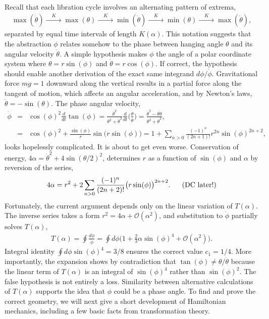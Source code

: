 \documentclass[nofootinbib,preprint]{revtex4-1}
\begin{document}
Recall that each libration cycle involves an alternating pattern of extrema,
\begin{eqnarray}
\max(\dot{\theta}) \xrightarrow{\;\;\;\;K\;\;\;\;} \max(\theta) 
 \xrightarrow{\;\;\;\;K\;\;\;\;} \min(\dot{\theta})
 \xrightarrow{\;\;\;\;K\;\;\;\;} \min(\theta) 
 \xrightarrow{\;\;\;\;K\;\;\;\;} \max(\dot{\theta}) \nonumber,
\end{eqnarray} 
separated by equal time intervals of length $K(\alpha)$. This notation suggests that the 
abstraction $\phi$ relates somehow to the phase between hanging angle $\theta$ and its angular 
velocity $\dot{\theta}$. A simple hypothesis makes $\phi$ the angle of a polar coordinate
system where $\theta=r\sin(\phi)$ and $\dot{\theta}=r\cos(\phi)$. If correct, the hypothesis should 
enable another derivation of the exact same integrand $d\phi/\dot{\phi}$. Gravitational force 
$mg=1$ downward along the vertical results in a partial force along the tangent of motion, 
which affects an angular acceleration, and by Newton's laws, $\ddot{\theta}=-\sin(\theta)$. 
The phase angular velocity,
\begin{eqnarray}
\dot{\phi} &=& \cos(\phi)^2 \frac{d}{dt} \tan(\phi) 
= \frac{\dot{\theta}^2}{\theta^2+\dot{\theta}^2}\frac{d}{dt}\bigg(\frac{\theta}{\dot{\theta}}\bigg)
=\frac{\dot{\theta}^2-\theta\ddot{\theta} }{\theta^2+\dot{\theta}^2}, \nonumber \\
&=& \cos(\phi)^2+\frac{\sin(\phi)}{r}\sin\big(r \sin(\phi)\big) \nonumber 
 = 1+\sum_{n>0} \frac{(-1)^n}{(2n+1)!} r^{2n} \sin(\phi)^{2n+2}, \nonumber
\end{eqnarray}
looks hopelessly complicated. It is about to get even worse. Conservation of 
energy, ${4 \alpha=\dot{\theta}^2+4 \sin(\theta/2)^2}$, 
determines $r$ as a function of $\sin(\phi)$ and $\alpha$ by reversion of the series,
\begin{eqnarray}
4\alpha = r^2 + 2\sum_{n>0}\frac{(-1)^n }{(2n+2)!} \big(r \sin(\phi)\big)^{2n+2} .  
\text{\;\;\;\;\;\;(DC later!)}\nonumber
\end{eqnarray}
Fortunately, the current argument depends only on the linear variation of $T(\alpha)$. The 
inverse series takes a form $r^2=4\alpha + \mathcal{O}(\alpha^2)$, and substitution to $\dot{\phi}$
partially solves $T(\alpha)$, 
\begin{eqnarray}
T(\alpha)= \oint \frac{d\phi}{\dot{\phi}} = \oint d\phi\bigg(1+\frac{2}{3}\alpha\sin(\phi)^4 + \mathcal{O}(\alpha^2) \bigg).\nonumber
\end{eqnarray}
Integral identity $\oint d\phi \sin(\phi)^4=3/8$ ensures the correct value $c_1=1/4$. More 
importantly, the expansion shows by contradiction that $\tan(\phi) \neq \theta/\dot{\theta}$ 
because the linear term of $T(\alpha)$ is an integral of $\sin(\phi)^4$ rather than $\sin(\phi)^2$.
The false hypothesis is not entirely a loss. Similarity between alternative calculations of 
$T(\alpha)$ supports the idea that $\phi$ could be a phase angle. To find and prove the correct 
geometry, we will next give a short development of Hamiltonian mechanics, including a few basic 
facts from transformation theory.
\end{document}
